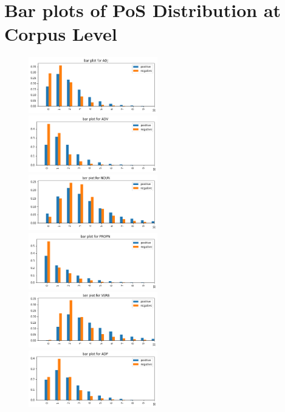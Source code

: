 \documentclass[12pt]{diazessay} %
\begin{document}
{\section{Bar plots of PoS Distribution at Corpus Level} %
\label{sec:appendix_a_bar_plots_of_pos_distribution_at_corpus_level}
    \begin{figure}[h!]
    \includegraphics[width=0.5\textwidth]{graphs/bar_pos/1.png}
    \includegraphics[width=0.5\textwidth]{graphs/bar_pos/2.png}
    \includegraphics[width=0.5\textwidth]{graphs/bar_pos/3.png}
    \includegraphics[width=0.5\textwidth]{graphs/bar_pos/4.png}
    \includegraphics[width=0.5\textwidth]{graphs/bar_pos/5.png}
    \includegraphics[width=0.5\textwidth]{graphs/bar_pos/6.png}

\end{figure}}
\end{document}
